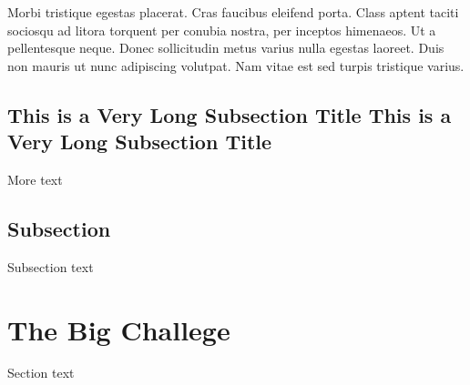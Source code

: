 Morbi tristique egestas placerat. Cras faucibus eleifend porta. Class aptent taciti sociosqu ad litora torquent per conubia nostra, per inceptos himenaeos. Ut a pellentesque neque. Donec sollicitudin metus varius nulla egestas laoreet. Duis non mauris ut nunc adipiscing volutpat. Nam vitae est sed turpis tristique varius. 

\subsection{This is a Very Long Subsection Title This is a Very Long Subsection Title}

More text
\subsection{Subsection}

Subsection text

\section{The Big Challege}

Section text
